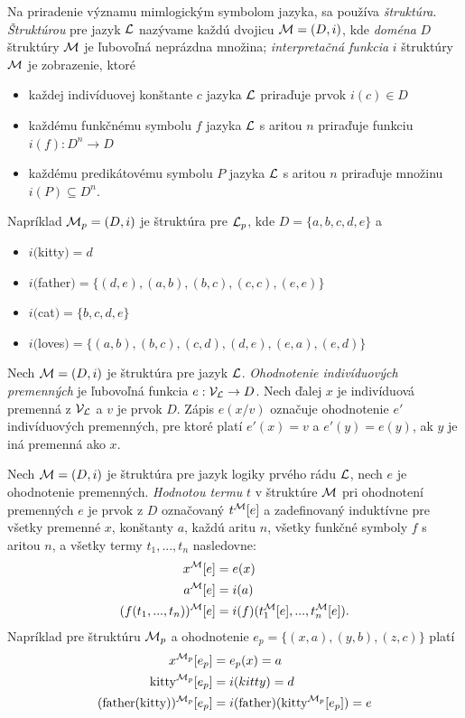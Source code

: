 Na priradenie významu mimlogickým symbolom jazyka, sa používa \emph{štruktúra}.
\emph{Štruktúrou} pre jazyk $\mathcal{L}$ nazývame každú dvojicu $\mathcal{M} = (D, i)$, kde
\emph{doména} $D$ štruktúry $\mathcal{M}$ je ľubovoľná neprázdna množina;
\emph{interpretačná funkcia} $i$ štruktúry $\mathcal{M}$ je zobrazenie, ktoré
\begin{itemize}
\item každej indivíduovej konštante $c$ jazyka $\mathcal{L}$ priraďuje prvok $i(c) \in D$
\item každému funkčnému symbolu $f$ jazyka $\mathcal{L}$ s aritou $n$ priraďuje funkciu \\$i(f): D^n \to D$
\item každému predikátovému symbolu $P$ jazyka $\mathcal{L}$ s aritou $n$ priraďuje množinu \\$i(P) \subseteq D^n$.
\end{itemize}
Napríklad $\mathcal{M}_p = (D, i)$ je štruktúra pre $\mathcal{L}_p$, kde $D = \{a, b, c, d, e\}$ a 
\begin{itemize}
\item $i($kitty$) = d$
\item $i($father$) = \{(d,e), (a,b), (b,c), (c,c), (e,e)\}$
\item $i($cat$) = \{b, c, d, e\}$
\item $i($loves$) = \{(a,b), (b,c), (c,d), (d,e), (e,a), (e,d)\}$
\end{itemize}

Nech $\mathcal{M} = (D, i)$ je štruktúra pre jazyk $\mathcal{L}$. \emph{Ohodnotenie indivíduových premenných} je ľubovoľná funkcia $e: \mathcal{V}_{\mathcal{L}} \to D$. Nech ďalej $x$ je indivíduová premenná z $\mathcal{V}_{\mathcal{L}}$ a $v$ je prvok $D$. Zápis $e(x/v)$ označuje ohodnotenie $e'$ indivíduových premenných, pre ktoré platí $e'(x) = v$ a $e'(y) = e(y)$, ak $y$ je iná premenná ako $x$.

Nech $\mathcal{M} = (D, i)$ je štruktúra pre jazyk logiky prvého rádu $\mathcal{L}$, nech $e$ je ohodnotenie premenných. \emph{Hodnotou termu} $t$ v štruktúre $\mathcal{M}$ pri ohodnotení premenných $e$ je prvok z $D$ označovaný $t^{\mathcal{M}} [e]$ a zadefinovaný induktívne pre všetky premenné $x$, konštanty $a$, každú aritu $n$, všetky funkčné symboly $f$ s aritou $n$, a všetky termy $t_1, ..., t_n$ nasledovne:
\begin{align*}
x^{\mathcal{M}} [e] &= e(x) \\
a^{\mathcal{M}} [e] &= i(a) \\
(f(t_1, ..., t_n))^{\mathcal{M}} [e] &= i(f)(t_1^{\mathcal{M}} [e], ..., t_n^{\mathcal{M}} [e]).
\end{align*}
Napríklad pre štruktúru $\mathcal{M}_p$ a ohodnotenie $e_p = \{(x,a), (y,b), (z,c)\}$ platí
\begin{align*}
x^{\mathcal{M}_p} [e_p] &= e_p(x) = a\\
\text{kitty}^{\mathcal{M}_p} [e_p] &= i(kitty) = d \\
(\text{father}(\text{kitty}))^{\mathcal{M}_p} [e_p] &= i(\text{father})(\text{kitty}^{\mathcal{M}_p} [e_p]) = e
\end{align*}

